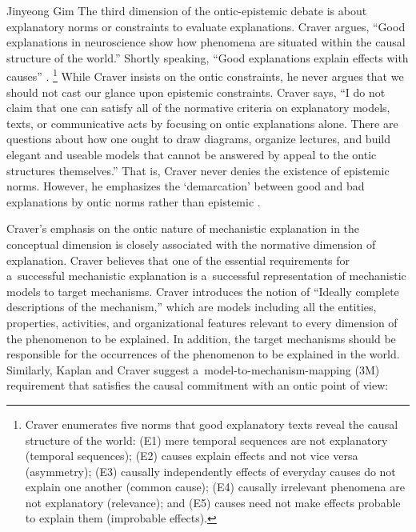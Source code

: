 \begin{artengenv}{Jinyeong Gim}
The third dimension of the ontic-epistemic debate is about explanatory norms or constraints to evaluate explanations. Craver
\parencite*[][p.21]{craver_explaining_2007} %
 argues, ``Good explanations in neuroscience show how phenomena are situated within the causal structure of the world.'' Shortly speaking, ``Good explanations explain effects with causes'' 
\parencite[][p.26]{craver_explaining_2007}.%
\footnote{Craver 
\parencite*[][p.26]{craver_explaining_2007} %
 enumerates five norms that good explanatory texts reveal the causal structure of the world: (E1) mere temporal sequences are not explanatory (temporal sequences); (E2) causes explain effects and not vice versa (asymmetry); (E3) causally independently effects of everyday causes do not explain one another (common cause); (E4) causally irrelevant phenomena are not explanatory (relevance); and (E5) causes need not make effects probable to explain them (improbable effects).} While Craver insists on the ontic constraints, he never argues that we should not cast our glance upon epistemic constraints. Craver 
\parencite*[][p.28]{kaiser_ontic_2014} %
 says, ``I do not claim that one can satisfy all of the normative criteria on explanatory models, texts, or communicative acts by focusing on ontic explanations alone. There are questions about how one ought to draw diagrams, organize lectures, and build elegant and useable models that cannot be answered by appeal to the ontic structures themselves.'' That is, Craver never denies the existence of epistemic norms. However, he emphasizes the ‘demarcation' between good and bad explanations by ontic norms rather than epistemic 
\parencite[][p.27]{kaiser_ontic_2014}.%


Craver's emphasis on the ontic nature of mechanistic explanation in the conceptual dimension is closely associated with the normative dimension of explanation. Craver believes that one of the essential requirements for a~successful mechanistic explanation is a~successful representation of mechanistic models to target mechanisms. Craver
\parencite*[][p.360]{craver_when_2006} %
 introduces the notion of ``Ideally complete descriptions of the mechanism,'' which are models including all the entities, properties, activities, and organizational features relevant to every dimension of the phenomenon to be explained. In addition, the target mechanisms should be responsible for the occurrences of the phenomenon to be explained in the world. Similarly, Kaplan and Craver 
\parencite*[][p.611]{kaplan_explanatory_2011} %
 suggest a~model-to-mechanism-mapping (3M) requirement that satisfies the causal commitment with an ontic point of view:


\end{artengenv}
